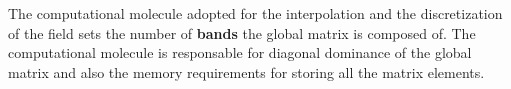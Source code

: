     
    
    \noindent The computational molecule adopted for the interpolation and the discretization of the field sets the number of \textbf{bands} the global matrix is composed of. The computational molecule is responsable for diagonal dominance of the global matrix and also the memory requirements for storing all the matrix elements. 


